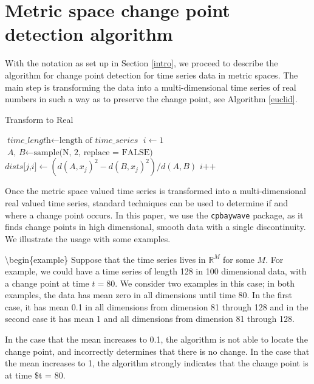 \documentclass[smallextended]{svjour3}       %
\begin{document}
\section{Metric space change point detection algorithm}\label{sec:1}

With the notation as set up in Section \ref{intro}, we proceed to
describe the algorithm for change point detection for time series data
in metric spaces. The main step is transforming the data into a
multi-dimensional time series of real numbers in such a way as to
preserve the change point, see Algorithm \ref{euclid}.

\begin{algorithm}
\caption{Transform to Real}\label{euclid}
\begin{algorithmic}[1]
\State $\textit{time\_length} \gets \text{length of }\textit{time\_series}$
\State $i \gets 1$
\State $\textit{A, B} \gets \text{sample(N, 2, replace = FALSE)}$
\State $\textit{dists[j,i]} \gets (d(A, x_j)^2 - d(B, x_j)^2)/d(A, B)$
\EndFor
\State $\textit{i++}$
\EndWhile
\EndProcedure
\end{algorithmic}
\end{algorithm}

Once the metric space valued time series is transformed into a
multi-dimensional real valued time series, standard techniques can be
used to determine if and where a change point occurs. In this paper, we
use the \texttt{cpbaywave} package, as it finds change points in high
dimensional, smooth data with a single discontinuity. We illustrate the
usage with some examples.

\textbackslash{}begin\{example\} Suppose that the time series lives in
\(\mathbb {R}^M\) for some \(M\). For example, we could have a time
series of length 128 in 100 dimensional data, with a change point at
time \(t = 80\). We consider two examples in this case; in both
examples, the data has mean zero in all dimensions until time 80. In the
first case, it has mean 0.1 in all dimensions from dimension 81 through
128 and in the second case it has mean 1 and all dimensions from
dimension 81 through 128.

In the case that the mean increases to 0.1, the algorithm is not able to
locate the change point, and incorrectly determines that there is no
change. In the case that the mean increases to 1, the algorithm strongly
indicates that the change point is at time \$t = 80.
\end{document}
